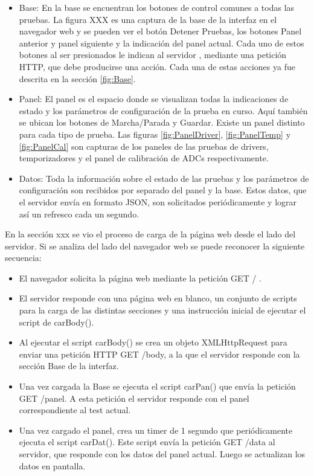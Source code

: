 \begin{itemize}
	\item Base: En la base se encuentran los botones de control comunes a todas las pruebas. La figura XXX es una captura de la base de la interfaz en el navegador web y se pueden ver el botón Detener Pruebas, los botones Panel anterior y panel siguiente y la indicación del panel actual. Cada uno de estos botones al ser presionados le indican al servidor , mediante una petición HTTP, que debe producirse una acción. Cada una de estas acciones ya fue descrita en la sección \ref{fig:Base}.
	\item Panel: El panel es el espacio donde se visualizan todas la indicaciones de estado y los parámetros de configuración de la prueba en curso. Aquí también se ubican los botones de Marcha/Parada y Guardar. Existe un panel distinto para cada tipo de prueba. Las figuras \ref{fig:PanelDriver}, \ref{fig:PanelTemp} y \ref{fig:PanelCal} son capturas de los paneles de las pruebas de drivers, temporizadores y el panel de calibración de ADCs respectivamente.

	\item Datos: Toda la información sobre el estado de las pruebas y los parámetros de configuración son recibidos por separado del panel y la base. Estos datos, que el servidor envía en formato JSON, son solicitados periódicamente y lograr así un refresco cada un segundo.
\end{itemize}

En la sección xxx se vio el proceso de carga de la página web desde el lado del servidor. Si se analiza del lado del navegador web se puede reconocer la siguiente secuencia:

\begin{itemize}
	\item El navegador solicita la página web mediante la petición GET / .
	\item El servidor responde con una página web en blanco, un conjunto de scripts para la carga de las distintas secciones y una instrucción inicial de ejecutar el script de carBody().
	\item Al ejecutar el script carBody() se crea un objeto XMLHttpRequest para enviar una petición HTTP GET /body, a la que el servidor responde con la sección Base de la interfaz.
	\item Una vez cargada la Base se ejecuta el script carPan() que envía la petición GET /panel. A esta petición el servidor responde con el panel correspondiente al test actual.
	\item Una vez cargado el panel, crea un timer de 1 segundo que periódicamente ejecuta el script carDat(). Este script envía la petición GET /data al servidor, que responde con los datos del panel actual. Luego se actualizan los datos en pantalla.
\end{itemize}

